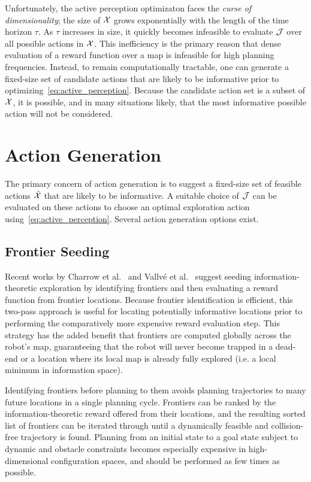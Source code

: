 Unfortunately, the active perception optimizaton faces the \textit{curse of dimensionality};
the size of $\mathcal{X}$ grows exponentially with the length of the time horizon $\tau$.
As $\tau$ increases in size, it quickly becomes infeasible to evaluate $\mathcal{J}$ over all
possible actions in $\mathcal{X}$. This inefficiency is the primary reason that dense
evaluation of a reward function over a map is infeasible for high planning
frequencies. Instead, to remain computationally tractable, one can generate a
fixed-size set of candidate actions that are likely to be informative prior to
optimizing~\eqref{eq:active_perception}. Because the candidate action set is a
subset of $\mathcal{X}$, it is possible, and in many situations likely, that the most
informative possible action will not be considered.

\section{Action Generation}
\label{sec:action_generation}

The primary concern of action generation is to suggest a fixed-size set of feasible actions
$\hat{\mathcal{X}}$ that are likely to be informative. A suitable choice of $\mathcal{J}$ can be
evaluated on these actions to choose an optimal exploration action
using~\eqref{eq:active_perception}. Several
action generation options exist.

\subsection{Frontier Seeding}
\label{subsec:frontier_seeding}

Recent works by Charrow et al.~\cite{charrow2015icra} and Vallv\'{e} et
al.~\cite{vallve2014dense} suggest seeding
information-theoretic exploration by identifying frontiers and then evaluating
a reward function from frontier locations. Because frontier
identification is efficient, this two-pass approach is useful for locating
potentially informative locations prior to performing the comparatively more
expensive reward evaluation step. This strategy has the added benefit that frontiers are computed
globally across the robot's map, guaranteeing that the robot will never become
trapped in a dead-end or a location where its local map is already fully
explored (i.e. a local minimum in information space).

Identifying frontiers before planning to them avoids planning
trajectories to many future locations in a single planning cycle. Frontiers can be ranked by the
information-theoretic reward offered from their locations, and the resulting sorted list
of frontiers can be iterated through until a dynamically feasible and
collision-free trajectory is found. Planning from an initial state to a goal state
subject to dynamic and obstacle constraints becomes especially expensive in
high-dimensional configuration spaces, and should be performed as few times as possible.

